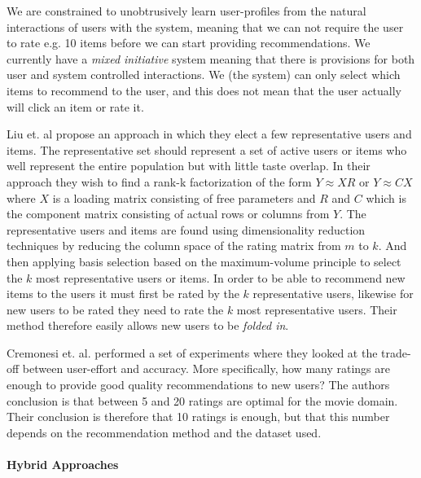 We are constrained to unobtrusively learn user-profiles from the natural
interactions of users with the system, meaning that we can not require the user
to rate e.g. 10 items before we can start providing recommendations. We
currently have a \emph{mixed initiative} system meaning that there is
provisions for both user and system controlled interactions. We (the system)
can only select which items to recommend to the user, and this does not mean
that the user actually will click an item or rate it.


Liu et. al \cite{Liu2011} propose an approach in which they elect a few
representative users and items. The representative set should represent a set
of active users or items who well represent the entire population but with
little taste overlap. In their approach they wish to find a rank-k
factorization of the form $Y \approx XR$ or $Y \approx CX$ where $X$ is a
loading matrix consisting of free parameters and $R$ and $C$ which is the
component matrix consisting of actual rows or columns from $Y$. The
representative users and items are found using dimensionality reduction
techniques by reducing the column space of the rating matrix from $m$ to $k$.
And then applying basis selection based on the maximum-volume principle to
select the $k$ most representative users or items. In order to be able to
recommend new items to the users it must first be rated by the $k$
representative users, likewise for new users to be rated they need to rate the
$k$ most representative users. Their method therefore easily allows new users
to be \emph{folded in}.


Cremonesi et. al. \cite{Cremonesi2012} performed a set of experiments where
they looked at the trade-off between user-effort and accuracy. More
specifically, how many ratings are enough to provide good quality
recommendations to new users? The authors conclusion is that between 5 and 20
ratings are optimal for the movie domain. Their conclusion is therefore that 10
ratings is enough, but that this number depends on the recommendation method
and the dataset used.

\paragraph{Hybrid Approaches}

